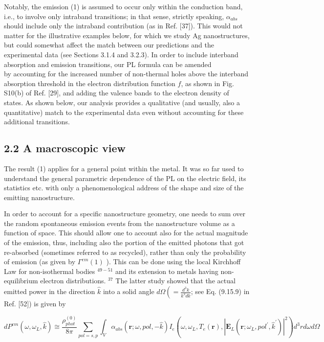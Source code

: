 \documentclass[10pt]{article}
\begin{document}
Notably, the emission (1) is assumed to occur only within the conduction band, i.e., to involve only intraband transitions; in that sense, strictly speaking, $\alpha_{a b s}$ should include only the intraband contribution (as in Ref. [37]). This would not matter for the illustrative examples below, for which we study Ag nanostructures, but could somewhat affect the match between our predictions and the experimental data (see Sections 3.1.4 and 3.2.3). In order to include interband absorption and emission transitions, our PL formula can be amended\\
by accounting for the increased number of non-thermal holes above the interband absorption threshold in the electron distribution function $f$, as shown in Fig. S10(b) of Ref. [29], and adding the valence bands to the electron density of states. As shown below, our analysis provides a qualitative (and usually, also a quantitative) match to the experimental data even without accounting for these additional transitions.

\subsection*{2.2 A macroscopic view}
The result (1) applies for a general point within the metal. It was so far used to understand the general parametric dependence of the PL on the electric field, its statistics etc. with only a phenomenological address of the shape and size of the emitting nanostructure.

In order to account for a specific nanostructure geometry, one needs to sum over the random spontaneous emission events from the nanostructure volume as a function of space. This should allow one to account also for the actual magnitude of the emission, thus, including also the portion of the emitted photons that got re-absorbed (sometimes referred to as recycled), rather than only the probability of emission (as given by $\Gamma^{e m}(1)$ ). This can be done using the local Kirchhoff Law for non-isothermal bodies ${ }^{49-51}$ and its extension to metals having non-equilibrium electron distributions. ${ }^{37}$ The latter study showed that the actual emitted power in the direction $\hat{k}$ into a solid angle $d \Omega\left(=\frac{d^{3} k}{k^{2} d k}\right.$; see Eq. (9.15.9) in Ref. [52]) is given by


\begin{equation*}
d P^{e m}\left(\omega, \omega_{L}, \hat{k}\right) \cong \frac{\rho_{p h o t}^{(0)}}{8 \pi} \sum_{p o l=s, p} \int_{V} \alpha_{a b s}(\mathbf{r} ; \omega, p o l,-\hat{k}) I_{e}\left(\omega, \omega_{L}, T_{e}(\mathbf{r}),\left|\mathbf{E}_{L}\left(\mathbf{r} ; \omega_{L}, p o l^{\prime}, \hat{k}^{\prime}\right)\right|^{2}\right) d^{3} r d \omega d \Omega \tag{8}
\end{equation*}
\end{document}
